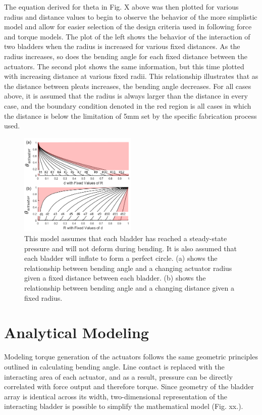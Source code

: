 \documentclass[letterpaper, 10 pt, conference]{ieeeconf}  %
\begin{document}
The equation derived for theta in Fig. X above was then plotted for various radius and distance values to begin to observe the behavior of the more simplistic model and allow for easier selection of the design criteria used in following force and torque models.  The plot of the left shows the behavior of the interaction of two bladders when the radius is increased for various fixed distances.  As the radius increases, so does the bending angle for each fixed distance between the actuators.  The second plot shows the same information, but this time plotted with increasing distance at various fixed radii.  This relationship illustrates that as the distance between pleats increases, the bending angle decreases.  For all cases above, it is assumed that the radius is always larger than the distance in every case, and the boundary condition denoted in the red region is all cases in which the distance is below the limitation of 5mm set by the specific fabrication process used. 

\begin{figure}[t!]
\centering
\includegraphics[width=0.5\textwidth]{graphs_model1.PNG}
\caption{This model assumes that each bladder has reached a steady-state pressure and will not deform during bending.  It is also assumed that each bladder will inflate to form a perfect circle.  (a) shows the relationship between bending angle and a changing actuator radius given a fixed distance between each bladder.  (b) shows the relationship between bending angle and a changing distance given a fixed radius.}
\label{fig:Graphs1}
\end{figure}	
\section{Analytical Modeling}

Modeling torque generation of the actuators follows the same geometric principles outlined in calculating bending angle. Line contact is replaced with the interacting area of each actuator, and as a result, pressure can be directly correlated with force output and therefore torque. Since geometry of the bladder array is identical across its width, two-dimensional representation of the interacting bladder is possible to simplify the mathematical model (Fig. xx.). 
\end{document}
